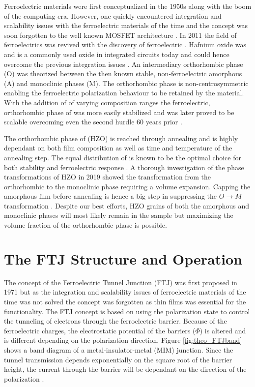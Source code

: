 \documentclass[11pt,twoside]{eitExjobb}
\begin{document}
Ferroelectric materials were first conceptualized in the 1950s along with the
boom of the computing era. However, one quickly encountered integration and
scalability issues with the ferroelectric materials of the time and the concept
was soon forgotten to the well known MOSFET architecture
\cite{mikolajick2020past}. In 2011 the field of ferroelectrics was revived with
the discovery of ferroelectric . Hafnium oxide was and is a commonly
used oxide in integrated circuits today and could hence overcome the previous
integration issues \cite{boscke2011ferroelectricity}. An intermediary
orthorhombic phase (O) was theorized between the then known stable,
non-ferroelectric amorphous (A) and monoclinic phases (M). The orthorhombic
phase is non-centrosymmetric enabling the ferroelectric polarization behaviour
to be retained by the material. With the addition of  of varying
composition ranges the ferroelectric, orthorhombic phase of  was more
easily stabilized and was later proved to be scalable overcoming even the
second hurdle 60 years prior \cite{muller2012ferroelectricity, cheema2020one}.

The orthorhombic phase of  (HZO) is reached through annealing and is
highly dependant on both film composition as well as time and temperature of the
annealing step. The equal distribution of  is known to
be the optimal choice for both stability and ferroelectric response
\cite{muller2012ferroelectricity}. A thorough investigation of the phase
transformations of HZO in 2019 showed the transformation from the orthorhombic
to the monoclinic phase requiring a volume expansion. Capping the amorphous
film before annealing is hence a big step in suppressing the $O \rightarrow M$
transformation \cite{migita2019phase}. Despite our best efforts, HZO grains of
both the amorphous and monoclinic phases will most likely remain in the sample
but maximizing the volume fraction of the orthorhombic phase is possible.

\section{The FTJ Structure and Operation}

The concept of the Ferroelectric Tunnel Junction (FTJ) was first proposed in 1971
but as the integration and scalability issues of ferroelectric materials of the
time was not solved the concept was forgotten as thin films was essential for
the functionality. The FTJ concept is based on using the polarization state to
control the tunneling of electrons through the ferroelectric barrier. Because
of the ferroelectric charges, the electrostatic potential of the barriers
($\Phi$) is altered and is different depending on the polarization direction.
Figure \ref{fig:theo_FTJband} shows a band diagram of a metal-insulator-metal
(MIM) junction. Since the tunnel transmission depends exponentially on the
square root of the barrier height, the current through the barrier will be
dependant on the direction of the polarization \cite{garcia2014ferroelectric}. 
\end{document}
